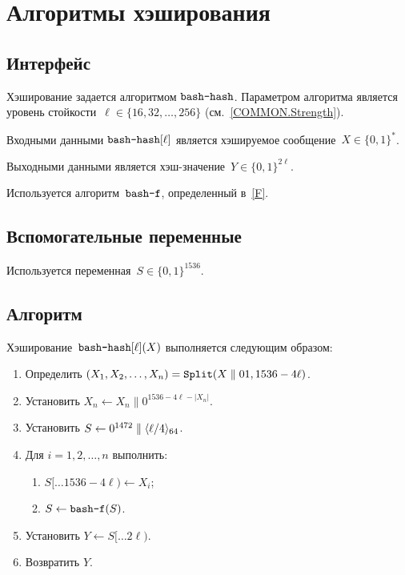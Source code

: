 \chapter{Алгоритмы хэширования}\label{HASH}

\section{Интерфейс}\label{HASH.IFace}

Хэширование задается алгоритмом $\texttt{bash-hash}$.
Параметром алгоритма является уровень стойкости~$\ell\in\{16,32,\ldots,256\}$ 
(см.~\ref{COMMON.Strength}).

Входными данными $\texttt{bash-hash}[\ell]$ является хэшируемое 
сообщение~$X\in\{0,1\}^*$.

Выходными данными является хэш-значение~$Y\in\{0,1\}^{2\ell}$.

Используется алгоритм~$\texttt{bash-f}$, определенный в~\ref{F}.

\section{Вспомогательные переменные}\label{HASH.Vars}

Используется переменная~$S\in\{0,1\}^{1536}$.

\section{Алгоритм}\label{HASH.Alg}

Хэширование~$\texttt{bash-hash}[\ell](X)$ выполняется следующим образом:
\begin{enumerate}
\item
Определить
$(X_1,X_2,\ldots,X_n)=\mathop{\texttt{Split}}\nolimits(X\parallel 01, 1536-4\ell)$.

\item
Установить 
$X_n\leftarrow X_n \parallel 0^{1536-4\ell-|X_n|}$.

\item
Установить
$S\leftarrow 0^{1472}\parallel\langle\ell/4\rangle_{64}$.

\item
Для $i=1,2,\ldots,n$ выполнить:
\begin{enumerate}
\item
$S[\dots 1536-4\ell)\leftarrow X_i$;
\item
$S\leftarrow\texttt{bash-f}(S)$.
\end{enumerate}

\item
Установить
$Y\leftarrow S[\dots 2\ell)$.

\item
Возвратить $Y$.
\end{enumerate}
